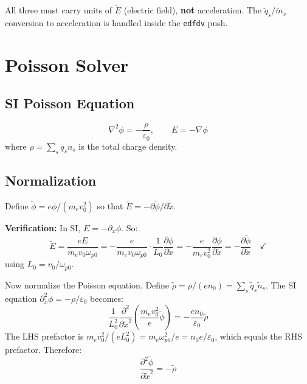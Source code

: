 \documentclass[11pt]{article}
\newcommand{\tl}[1]{\tilde{#1}}
\newcommand{\wpz}{\omega_{p0}}
\newcommand{\code}[1]{\texttt{#1}}
\newcommand{\tq}{\tl{q}}
\newcommand{\tm}{\tl{m}}
\begin{document}
All three must carry units of $\tl{E}$ (electric field), \textbf{not} acceleration. The $\tq_s/\tm_s$ conversion to acceleration is handled inside the \code{edfdv} push.

\newpage
\section{Poisson Solver}
\label{sec:poisson}

\subsection{SI Poisson Equation}

\begin{equation}
    \nabla^2 \phi = -\frac{\rho}{\varepsilon_0}, \qquad E = -\nabla \phi
\end{equation}
where $\rho = \sum_s q_s n_s$ is the total charge density.

\subsection{Normalization}

Define $\tl{\phi} = e\phi / (m_e v_0^2)$ so that $\tl{E} = -\partial\tl{\phi}/\partial\tl{x}$.

\textbf{Verification:} In SI, $E = -\partial_x \phi$. So:
\begin{equation}
    \tl{E} = \frac{eE}{m_e v_0 \wpz} = -\frac{e}{m_e v_0 \wpz} \cdot \frac{1}{L_0} \frac{\partial \phi}{\partial \tl{x}}
    = -\frac{e}{m_e v_0^2} \frac{\partial \phi}{\partial \tl{x}}
    = -\frac{\partial \tl{\phi}}{\partial \tl{x}} \quad \checkmark
\end{equation}
using $L_0 = v_0/\wpz$.

Now normalize the Poisson equation. Define $\tl{\rho} = \rho / (e n_0) = \sum_s \tq_s \tl{n}_s$. The SI equation $\partial_{\tl{x}}^2 \phi = -\rho/\varepsilon_0$ becomes:
\begin{equation}
    \frac{1}{L_0^2} \frac{\partial^2}{\partial \tl{x}^2}\left(\frac{m_e v_0^2}{e}\tl{\phi}\right)
    = -\frac{e n_0}{\varepsilon_0} \tl{\rho}
\end{equation}
The LHS prefactor is $m_e v_0^2 / (e L_0^2) = m_e \wpz^2 / e = n_0 e / \varepsilon_0$, which equals the RHS prefactor. Therefore:
\begin{equation}
    \boxed{\frac{\partial^2 \tl{\phi}}{\partial \tl{x}^2} = -\tl{\rho}}
    \label{eq:poisson-norm}
\end{equation}
\end{document}
